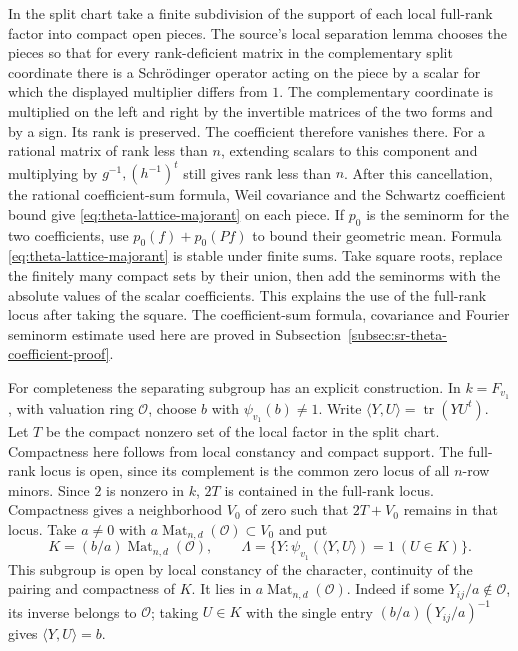 In the split chart take a finite subdivision of the support of each
local full-rank factor into compact open pieces. The source's local
separation lemma chooses the pieces so that for every rank-deficient
matrix in the complementary split coordinate there is a Schr\"odinger
operator acting on the piece by a scalar for which the displayed
multiplier differs from \(1\). The complementary coordinate is
multiplied on the left and right by the invertible matrices of the
two forms and by a sign. Its rank is preserved. The coefficient
therefore vanishes there. For a rational matrix of rank less than
\(n\), extending scalars to this component and multiplying by
\(g^{-1},(h^{-1})^t\) still gives rank less than \(n\).
After this cancellation, the rational coefficient-sum formula,
Weil covariance and the Schwartz coefficient bound give
\eqref{eq:theta-lattice-majorant} on each piece. If \(p_0\) is
the seminorm for the two coefficients, use
\(p_0(f)+p_0(Pf)\) to bound their geometric mean. Formula
\eqref{eq:theta-lattice-majorant} is stable under finite sums. Take square roots, replace the finitely many compact sets by their
union, then add the seminorms with the absolute values of the scalar
coefficients. This explains the use of the full-rank locus after
taking the square. The coefficient-sum formula, covariance and Fourier seminorm estimate
used here are proved in
Subsection~\ref{subsec:sr-theta-coefficient-proof}.

For completeness the separating subgroup has an explicit construction.
In \(k=F_{v_1}\), with valuation ring \(\mathcal O\), choose \(b\)
with \(\psi_{v_1}(b)\ne1\). Write
\(\langle Y,U\rangle=\operatorname{tr}(YU^t)\).
Let \(T\) be the compact nonzero set of the local factor in the split
chart. Compactness here follows from local constancy and compact
support. The full-rank locus is open, since its complement is the
common zero locus of all \(n\)-row minors. Since \(2\) is nonzero
in \(k\), \(2T\) is contained in the full-rank locus. Compactness
gives a neighborhood \(V_0\) of zero such that \(2T+V_0\) remains
in that locus. Take \(a\ne0\) with
\(a\operatorname{Mat}_{n,d}(\mathcal O)\subset V_0\) and put
\[
 K=(b/a)\operatorname{Mat}_{n,d}(\mathcal O),\qquad
 \Lambda=\{Y:\psi_{v_1}(\langle Y,U\rangle)=1\ (U\in K)\}.
\]
This subgroup is open by local constancy of the character, continuity
of the pairing and compactness of \(K\). It lies in
\(a\operatorname{Mat}_{n,d}(\mathcal O)\). Indeed if some
\(Y_{ij}/a\notin\mathcal O\), its inverse belongs to \(\mathcal O\);
taking \(U\in K\) with the single entry
\((b/a)(Y_{ij}/a)^{-1}\) gives \(\langle Y,U\rangle=b\).


